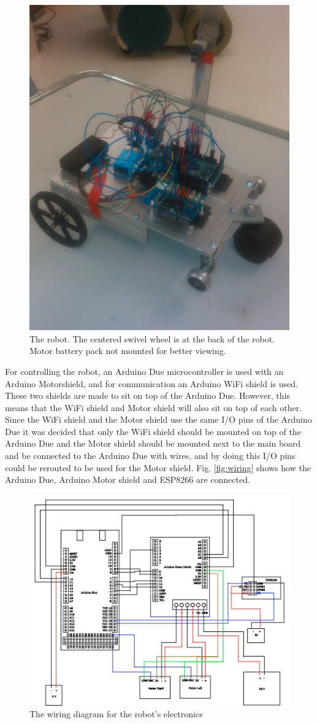 \documentclass[11pt]{article}
\begin{document}
\begin{figure}[ht]
  \centering
  \includegraphics[width=.6\textwidth]{figures/robot.jpg}
  \caption{\label{fig:robot} The robot. The centered swivel wheel is at the back of the robot. Motor battery pack not mounted for better viewing.}
\end{figure}


For controlling the robot, an Arduino Due microcontroller is used with an Arduino Motorshield, and for communication an Arduino WiFi shield is used. These two shields are made to sit on top of the Arduino Due. However, this means that the WiFi shield and Motor shield will also sit on top of each other. Since the WiFi shield and the Motor shield use the same I/O pins of the Arduino Due it was decided that only the WiFi shield should be mounted on top of the Arduino Due and the Motor shield should be mounted next to the main board and be connected to the Arduino Due with wires, and by doing this I/O pins could be rerouted to be used for the Motor shield. Fig. \vref{fig:wiring} shows how the Arduino Due, Arduino Motor shield and ESP8266 are connected. \par

\begin{figure}[ht]
  \centering
  \includegraphics[width=.75\textwidth]{figures/wiring.jpg}
  \caption{\label{fig:wiring} The wiring diagram for the robot's electronics}
\end{figure}
\end{document}
